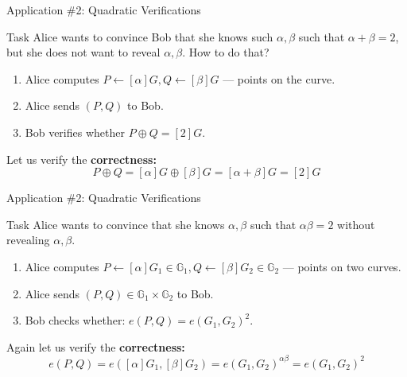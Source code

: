 \documentclass{zkdl-presentation-template}
\begin{document}
    \begin{frame}{Application \#2: Quadratic Verifications}
        \begin{block}{Task}
            Alice wants to convince Bob that she knows such $\alpha,\beta$ such that $\alpha + \beta = 2$, but she does not want to reveal $\alpha,\beta$. How to do that?
        \end{block}

        \begin{example}
            \begin{enumerate}
                \item Alice computes $P \gets [\alpha]G, Q \gets [\beta]G$ --- points on the curve.
                \item  Alice sends $(P,Q)$ to Bob.
                \item  Bob verifies whether $P\oplus Q = [2]G$.
            \end{enumerate}
            
             Let us verify the \textbf{correctness:} 
            \begin{equation*}
                P\oplus Q = [\alpha]G \oplus [\beta]G = [\alpha+\beta]G = [2]G
            \end{equation*}
        \end{example}
    \end{frame}

    \begin{frame}{Application \#2: Quadratic Verifications}
        \begin{block}{Task}
            Alice wants to convince that she knows $\alpha,\beta$ such that $\alpha\beta=2$ without revealing $\alpha,\beta$.
        \end{block}

        \begin{example}
            \begin{enumerate}
                \item Alice computes $P \gets [\alpha]G_1 \in \mathbb{G}_1, Q \gets [\beta]G_2 \in \mathbb{G}_2$ --- points on two curves.
                \item  Alice sends $(P,Q) \in \mathbb{G}_1 \times \mathbb{G}_2$ to Bob.
                \item  Bob checks whether: $e(P,Q) = e(G_1,G_2)^{2}$.
            \end{enumerate}
            
             Again let us verify the \textbf{correctness:} 
            \begin{equation*}
                e(P,Q) = e([\alpha]G_1,[\beta]G_2) = e(G_1,G_2)^{\alpha\beta} = e(G_1,G_2)^{2}
            \end{equation*}
        \end{example}
    \end{frame}
\end{document}
